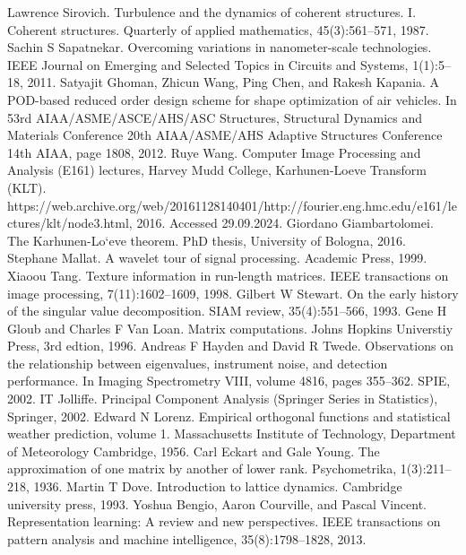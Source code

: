 \documentclass[preprint,12pt]{elsarticle}
\begin{document}
\begin{thebibliography}{000}
 Lawrence Sirovich. Turbulence and the dynamics of coherent structures. I. Coherent structures. Quarterly of applied mathematics, 45(3):561–571, 1987. 
 Sachin S Sapatnekar. Overcoming variations in nanometer-scale technologies. IEEE Journal on Emerging and Selected Topics in Circuits and Systems, 1(1):5–18, 2011. 
 Satyajit Ghoman, Zhicun Wang, Ping Chen, and Rakesh Kapania. A POD-based reduced order design scheme for shape optimization of air vehicles. In 53rd AIAA/ASME/ASCE/AHS/ASC Structures, Structural Dynamics and Materials Conference 20th AIAA/ASME/AHS Adaptive Structures Conference 14th AIAA, page 1808, 2012. 
 Ruye Wang. Computer Image Processing and Analysis (E161) lectures, Harvey Mudd College, Karhunen-Loeve Transform (KLT). https://web.archive.org/web/20161128140401/http://fourier.eng.hmc.edu/e161/lectures/klt/node3.html, 2016. Accessed 29.09.2024. 
 Giordano Giambartolomei. The Karhunen-Lo`eve theorem. PhD thesis, University of Bologna, 2016. 
 Stephane Mallat. A wavelet tour of signal processing. Academic Press, 1999. 
 Xiaoou Tang. Texture information in run-length matrices. IEEE transactions on image processing, 7(11):1602–1609, 1998. 
 Gilbert W Stewart. On the early history of the singular value decomposition. SIAM review, 35(4):551–566, 1993. 
 Gene H Gloub and Charles F Van Loan. Matrix computations. Johns Hopkins Universtiy Press, 3rd edtion, 1996. 
 Andreas F Hayden and David R Twede. Observations on the relationship between eigenvalues, instrument noise, and detection performance. In Imaging Spectrometry VIII, volume 4816, pages 355–362. SPIE, 2002. 
 IT Jolliffe. Principal Component Analysis (Springer Series in Statistics), Springer, 2002. 
 Edward N Lorenz. Empirical orthogonal functions and statistical weather prediction, volume 1. Massachusetts Institute of Technology, Department of Meteorology Cambridge, 1956. 
 Carl Eckart and Gale Young. The approximation of one matrix by another of lower rank. Psychometrika, 1(3):211–218, 1936. 
 Martin T Dove. Introduction to lattice dynamics. Cambridge university press, 1993. 
 Yoshua Bengio, Aaron Courville, and Pascal Vincent. Representation learning: A review and new perspectives. IEEE transactions on pattern analysis and machine intelligence, 35(8):1798–1828, 2013. 

\end{thebibliography}
\end{document}

